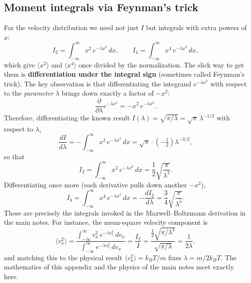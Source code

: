 \documentclass{report}
\numberwithin{equation}{section}
\begin{document}
\subsection{Moment integrals via Feynman's trick}
For the velocity distribution we need not just $I$ but integrals with extra powers of $x$:
\begin{equation}
	I_2 = \int_{-\infty}^{\infty} x^2\,e^{-\lambda x^2}\,dx,\qquad
	I_4 = \int_{-\infty}^{\infty} x^4\,e^{-\lambda x^2}\,dx,
\end{equation}
which give $\langle x^2\rangle$ and $\langle x^4\rangle$ once divided by the normalization. The slick way to get them is \textbf{differentiation under the integral sign} (sometimes called Feynman's trick). The key observation is that differentiating the integrand $e^{-\lambda x^2}$ with respect to the \emph{parameter} $\lambda$ brings down exactly a factor of $-x^2$:
\begin{equation}
	\frac{\partial}{\partial\lambda}e^{-\lambda x^2} = -x^2\,e^{-\lambda x^2}.
\end{equation}
Therefore, differentiating the known result $I(\lambda) = \sqrt{\pi/\lambda} = \sqrt{\pi}\,\lambda^{-1/2}$ with respect to $\lambda$,
\begin{equation}
	\frac{dI}{d\lambda} = -\int_{-\infty}^{\infty} x^2\,e^{-\lambda x^2}\,dx = \sqrt{\pi}\cdot\left(-\tfrac12\right)\lambda^{-3/2},
\end{equation}
so that
\begin{equation}
	I_2 = \int_{-\infty}^{\infty} x^2\,e^{-\lambda x^2}\,dx = \frac{1}{2}\sqrt{\frac{\pi}{\lambda^3}}.
\end{equation}
Differentiating once more (each derivative pulls down another $-x^2$),
\begin{equation}
	I_4 = \int_{-\infty}^{\infty} x^4\,e^{-\lambda x^2}\,dx = -\frac{dI_2}{d\lambda} = \frac{3}{4}\sqrt{\frac{\pi}{\lambda^5}}.
\end{equation}
These are precisely the integrals invoked in the Maxwell--Boltzmann derivation in the main notes. For instance, the mean-square velocity component is
\begin{equation}
	\langle v_x^2\rangle = \frac{\displaystyle\int_{-\infty}^{\infty} v_x^2\,e^{-\lambda v_x^2}\,dv_x}{\displaystyle\int_{-\infty}^{\infty} e^{-\lambda v_x^2}\,dv_x}
	= \frac{I_2}{I} = \frac{\tfrac12\sqrt{\pi/\lambda^3}}{\sqrt{\pi/\lambda}} = \frac{1}{2\lambda},
\end{equation}
and matching this to the physical result $\langle v_x^2\rangle = k_BT/m$ fixes $\lambda = m/2k_BT$. The mathematics of this appendix and the physics of the main notes meet exactly here.
\end{document}
